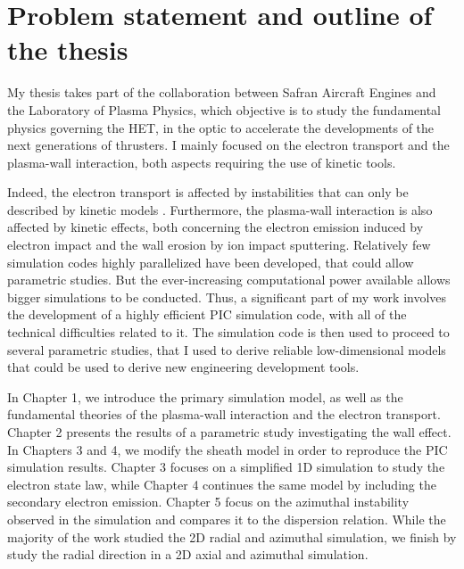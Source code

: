 
\section{Problem statement and outline of the thesis}
\label{sec-problematic}

My thesis takes part of the collaboration between Safran Aircraft Engines and the Laboratory of Plasma Physics, which objective is to study the fundamental physics governing the \ac{HET}, in the optic to accelerate the developments of the next generations of thrusters.
I mainly focused on the electron transport and the plasma-wall interaction,
both aspects requiring the use of kinetic tools.

Indeed, the electron transport is affected by instabilities that can only be described by kinetic models \citep{adam2008a,lafleur2016a}.
Furthermore, the plasma-wall interaction is also affected by kinetic effects, both concerning the electron emission induced by electron impact \citep{barral2003a,raitses2011,sydorenko2006} and the wall erosion by ion impact sputtering.
Relatively few simulation codes highly parallelized have been developed, that could allow parametric studies.
But the ever-increasing computational power available allows bigger simulations to be conducted.
Thus, a significant part of my work involves the development of a highly efficient \ac{PIC} simulation code, with all of the technical difficulties related to it.
The simulation code is then used to proceed to several parametric studies, that I used to derive reliable low-dimensional models that could be used to derive new engineering development tools.


\vspace{1em}
In Chapter 1, we introduce the primary simulation model, as well as the fundamental theories of the plasma-wall interaction and the electron transport.
Chapter 2 presents the results of a parametric study investigating the wall effect.
In Chapters 3 and 4, we modify the sheath model in order to reproduce the \ac{PIC} simulation results.
Chapter 3 focuses on a simplified \ac{1D} simulation to study the electron state law, while Chapter 4 continues the same model by including the secondary electron emission.
Chapter 5 focus on the azimuthal instability observed in the simulation and compares it to the dispersion relation.
While the majority of the work studied the \ac{2D} radial and azimuthal simulation, we finish by study the radial direction in a \ac{2D} axial and azimuthal simulation.